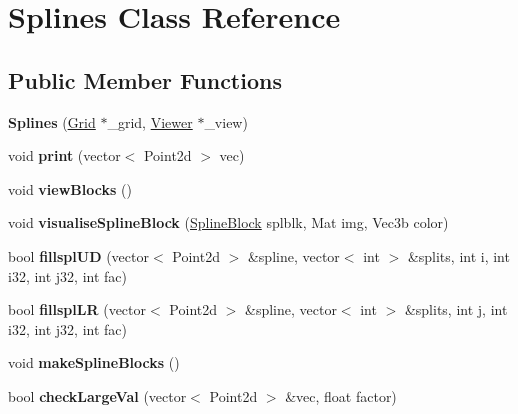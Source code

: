 \hypertarget{class_splines}{}\section{Splines Class Reference}
\label{class_splines}
\subsection*{Public Member Functions}
\begin{DoxyCompactItemize}
\item 
\mbox{\label{class_splines_aecf892b80d5d75b7013e36ca3454db0c}} 
{\bfseries Splines} (\mbox{\hyperlink{class_grid}{Grid}} $\ast$\+\_\+grid, \mbox{\hyperlink{class_viewer}{Viewer}} $\ast$\+\_\+view)
\item 
\mbox{\label{class_splines_a8edd90159a7656f04b84b5a80c540db8}} 
void {\bfseries print} (vector$<$ Point2d $>$ vec)
\item 
\mbox{\label{class_splines_ab83cb7bdf1222487e097b8ffd3c4851b}} 
void {\bfseries view\+Blocks} ()
\item 
\mbox{\label{class_splines_aa5b8af4397b25cfb41e3a56e291fa389}} 
void {\bfseries visualise\+Spline\+Block} (\mbox{\hyperlink{class_spline_block}{Spline\+Block}} splblk, Mat img, Vec3b color)
\item 
\mbox{\label{class_splines_a9c202065b539aa7f15977341e0f16d0f}} 
bool {\bfseries fillspl\+UD} (vector$<$ Point2d $>$ \&spline, vector$<$ int $>$ \&splits, int i, int i32, int j32, int fac)
\item 
\mbox{\label{class_splines_aaa0f971da9b4ef10aaccb14f2c4842e8}} 
bool {\bfseries fillspl\+LR} (vector$<$ Point2d $>$ \&spline, vector$<$ int $>$ \&splits, int j, int i32, int j32, int fac)
\item 
\mbox{\label{class_splines_af29eaabde00575c92a69446a090ef44a}} 
void {\bfseries make\+Spline\+Blocks} ()
\item 
\mbox{\label{class_splines_aa8d671ab9b2943f8a42e40bef4d1dbd2}} 
bool {\bfseries check\+Large\+Val} (vector$<$ Point2d $>$ \&vec, float factor)

\end{DoxyCompactItemize}
